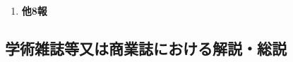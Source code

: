 \documentclass[11pt,a4paper,uplatex,twoside,dvipdfmx]{ujarticle} 	%
\renewcommand{\emph}[1]{{\sffamily\gtfamily\bfseries #1}}
\renewcommand{\bf}{\bfseries\sffamily\gtfamily}
\newcommand{\研究課題名}{\mgfamily ストカスティック形式、原始ブラックホール、重力波観測から迫るインフレーション}
\newcommand{\研究機関名}{\mgfamily 名古屋大学}
\newcommand{\申請者氏名}{\mgfamily 多田 祐一郎}
\newcommand{\研究代表者氏名}{\申請者氏名}
\newcommand{\研究期間の最終元号年度}{34}	%
\begin{document}
{\begin{enumerate}
		
		\item[] \emph{他8報}
	\end{enumerate}
	
	
				

}

\subsection{学術雑誌等又は商業誌における解説・総説}
\newcommand{\学術雑誌等または商業誌における解説や総説}{%
	$\,\,$ なし
		
}
\end{document}
